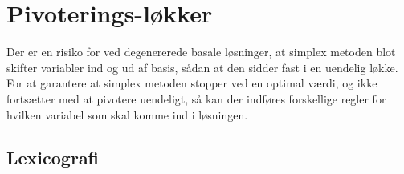 \section{Pivoterings-løkker}
 Der er en risiko for ved degenererede basale løsninger, at simplex metoden blot skifter variabler ind og ud af basis, sådan at den sidder fast i en uendelig løkke.  
For at garantere at simplex metoden stopper ved en optimal værdi, og ikke fortsætter med at pivotere uendeligt, så kan der indføres forskellige regler for hvilken variabel som skal komme ind i løsningen.

\subsection{Lexicografi}

